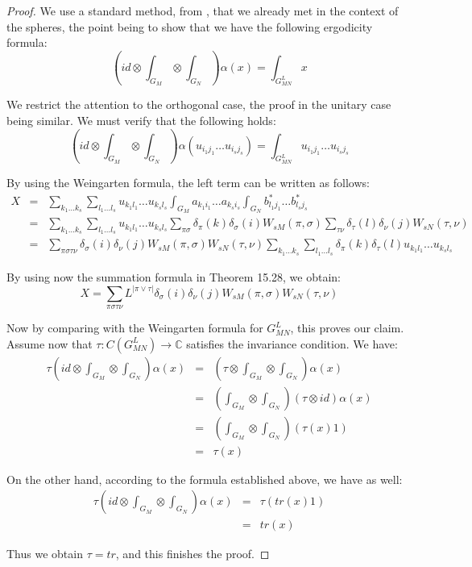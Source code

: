 \documentclass[12pt]{amsbook}
\begin{document}
\begin{proof}
We use a standard method, from \cite{bgo}, that we already met in the context of the spheres, the point being to show that we have the following ergodicity formula: 
$$\left(id\otimes\int_{G_M}\otimes\int_{G_N}\right)\alpha(x)=\int_{G_{MN}^L}x$$

We restrict the attention to the orthogonal case, the proof in the unitary case being similar. We must verify that the following holds:
$$\left(id\otimes\int_{G_M}\otimes\int_{G_N}\right)\alpha(u_{i_1j_1}\ldots u_{i_sj_s})=\int_{G_{MN}^L}u_{i_1j_1}\ldots u_{i_sj_s}$$

By using the Weingarten formula, the left term can be written as follows:
\begin{eqnarray*}
X
&=&\sum_{k_1\ldots k_s}\sum_{l_1\ldots l_s}u_{k_1l_1}\ldots u_{k_sl_s}\int_{G_M}a_{k_1i_1}\ldots a_{k_si_s}\int_{G_N}b_{l_1j_1}^*\ldots b_{l_sj_s}^*\\
&=&\sum_{k_1\ldots k_s}\sum_{l_1\ldots l_s}u_{k_1l_1}\ldots u_{k_sl_s}\sum_{\pi\sigma}\delta_\pi(k)\delta_\sigma(i)W_{sM}(\pi,\sigma)\sum_{\tau\nu}\delta_\tau(l)\delta_\nu(j)W_{sN}(\tau,\nu)\\
&=&\sum_{\pi\sigma\tau\nu}\delta_\sigma(i)\delta_\nu(j)W_{sM}(\pi,\sigma)W_{sN}(\tau,\nu)\sum_{k_1\ldots k_s}\sum_{l_1\ldots l_s}\delta_\pi(k)\delta_\tau(l)u_{k_1l_1}\ldots u_{k_sl_s}
\end{eqnarray*}

By using now the summation formula in Theorem 15.28, we obtain:
$$X=\sum_{\pi\sigma\tau\nu}L^{|\pi\vee\tau|}\delta_\sigma(i)\delta_\nu(j)W_{sM}(\pi,\sigma)W_{sN}(\tau,\nu)$$

Now by comparing with the Weingarten formula for $G_{MN}^L$, this proves our claim. Assume now that $\tau:C(G_{MN}^L)\to\mathbb C$ satisfies the invariance condition. We have:
\begin{eqnarray*}
\tau\left(id\otimes\int_{G_M}\otimes\int_{G_N}\right)\alpha(x)
&=&\left(\tau\otimes\int_{G_M}\otimes\int_{G_N}\right)\alpha(x)\\
&=&\left(\int_{G_M}\otimes\int_{G_N}\right)(\tau\otimes id)\alpha(x)\\
&=&\left(\int_{G_M}\otimes\int_{G_N}\right)(\tau(x)1)\\
&=&\tau(x)
\end{eqnarray*}

On the other hand, according to the formula established above, we have as well:
\begin{eqnarray*}
\tau\left(id\otimes\int_{G_M}\otimes\int_{G_N}\right)\alpha(x)
&=&\tau(tr(x)1)\\
&=&tr(x)
\end{eqnarray*}

Thus we obtain $\tau=tr$, and this finishes the proof.
\end{proof}
\end{document}
